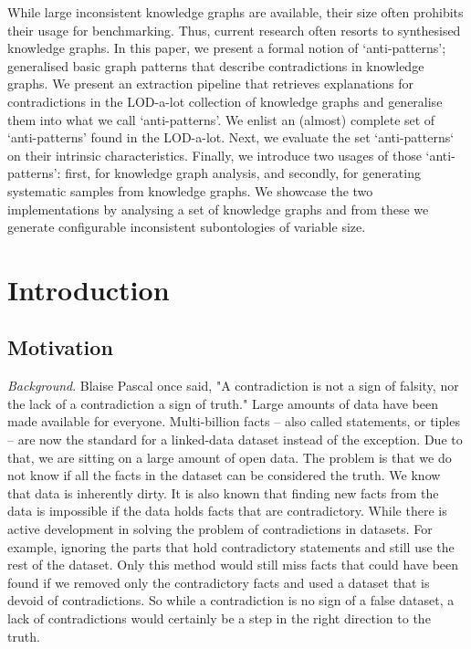 \documentclass[11pt,letterpaper ,oneside ]{book}
\begin{document}
	While large inconsistent knowledge graphs are available, their size often prohibits their usage for benchmarking. Thus, current research often resorts to synthesised knowledge graphs. In this paper, we present a formal notion of `anti-patterns'; generalised basic graph patterns that describe contradictions in knowledge graphs. We present an extraction pipeline that retrieves explanations for contradictions in the LOD-a-lot collection of knowledge graphs and generalise them into what we call `anti-patterns'. We enlist an (almost) complete set of `anti-patterns' found in the LOD-a-lot. Next, we evaluate the set `anti-patterns` on their intrinsic characteristics. Finally, we introduce two usages of those `anti-patterns': first, for knowledge graph analysis, and secondly, for generating systematic samples from knowledge graphs. We showcase the two implementations by analysing a set of knowledge graphs and from these we generate configurable inconsistent subontologies of variable size. 
	
	\newpage
	\tableofcontents
	\newpage
	
	\chapter{Introduction}\label{Introduction}
	\section{Motivation}
	\textit{Background}. Blaise Pascal once said, "A contradiction is not a sign of falsity, nor the lack of a contradiction a sign of truth." Large amounts of data have been made available for everyone. Multi-billion facts – also called statements, or tiples – are now the standard for a linked-data dataset instead of the exception. Due to that, we are sitting on a large amount of open data. The problem is that we do not know if all the facts in the dataset can be considered the truth. We know that data is inherently dirty. It is also known that finding new facts from the data is impossible if the data holds facts that are contradictory. While there is active development in solving the problem of contradictions in datasets. For example, ignoring the parts that hold contradictory statements and still use the rest of the dataset. Only this method would still miss facts that could have been found if we removed only the contradictory facts and used a dataset that is devoid of contradictions. So while a contradiction is no sign of a false dataset, a lack of contradictions would certainly be a step in the right direction to the truth.\\
	
\end{document}
